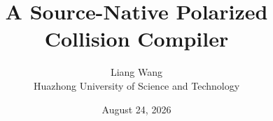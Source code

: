 \documentclass[11pt,a4paper]{article}
\title{A Source-Native Polarized Collision Compiler}
\author{Liang Wang\\Huazhong University of Science and Technology}
\date{August 24, 2026}
\theoremstyle{remark}\newtheorem{remark}[theorem]{Remark}
\begin{document}
\maketitle
\begin{abstract}\end{abstract}







\end{document}
